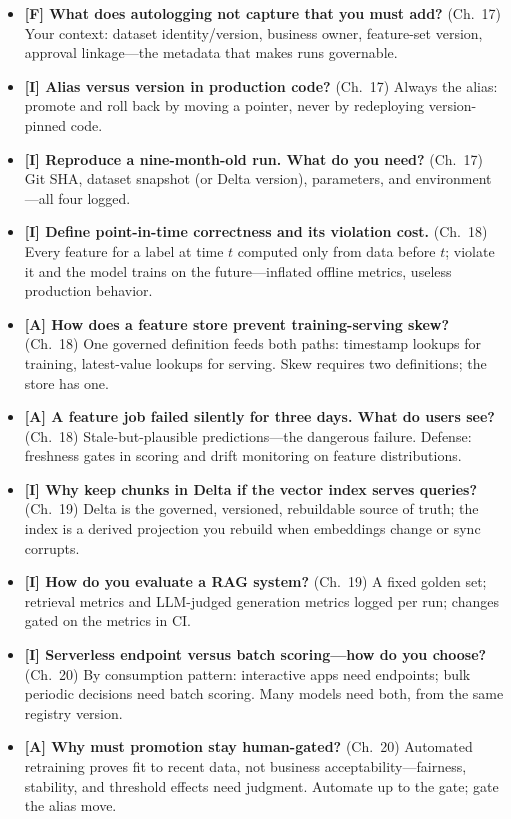 \begin{itemize}
    \item \textbf{[F] What does autologging not capture that you must add?} (Ch.~17) Your
    context: dataset identity/version, business owner, feature-set version, approval
    linkage---the metadata that makes runs governable.
    \item \textbf{[I] Alias versus version in production code?} (Ch.~17) Always the alias:
    promote and roll back by moving a pointer, never by redeploying version-pinned code.
    \item \textbf{[I] Reproduce a nine-month-old run. What do you need?} (Ch.~17) Git SHA,
    dataset snapshot (or Delta version), parameters, and environment---all four logged.
    \item \textbf{[I] Define point-in-time correctness and its violation cost.} (Ch.~18)
    Every feature for a label at time $t$ computed only from data before $t$; violate it and
    the model trains on the future---inflated offline metrics, useless production behavior.
    \item \textbf{[A] How does a feature store prevent training-serving skew?} (Ch.~18) One
    governed definition feeds both paths: timestamp lookups for training, latest-value lookups
    for serving. Skew requires two definitions; the store has one.
    \item \textbf{[A] A feature job failed silently for three days. What do users see?}
    (Ch.~18) Stale-but-plausible predictions---the dangerous failure. Defense: freshness gates
    in scoring and drift monitoring on feature distributions.
    \item \textbf{[I] Why keep chunks in Delta if the vector index serves queries?} (Ch.~19)
    Delta is the governed, versioned, rebuildable source of truth; the index is a derived
    projection you rebuild when embeddings change or sync corrupts.
    \item \textbf{[I] How do you evaluate a RAG system?} (Ch.~19) A fixed golden set;
    retrieval metrics and LLM-judged generation metrics logged per run; changes gated on the
    metrics in CI.
    \item \textbf{[I] Serverless endpoint versus batch scoring---how do you choose?} (Ch.~20)
    By consumption pattern: interactive apps need endpoints; bulk periodic decisions need
    batch scoring. Many models need both, from the same registry version.
    \item \textbf{[A] Why must promotion stay human-gated?} (Ch.~20) Automated retraining
    proves fit to recent data, not business acceptability---fairness, stability, and threshold
    effects need judgment. Automate up to the gate; gate the alias move.
\end{itemize}

